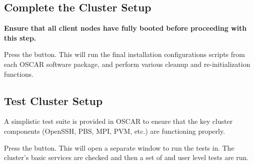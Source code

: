 
\subsection{Complete the Cluster Setup}
\label{det:complete-cluster-setup}

{\bf Ensure that all client nodes have fully booted before proceeding
  with this step.}

Press the  button.  This will run the
final installation configurations scripts from each OSCAR software
package, and perform various cleanup and re-initialization functions.



\subsection{Test Cluster Setup}
\label{det:test-cluster}
            
A simplistic test suite is provided in OSCAR to ensure that the key
cluster components (OpenSSH, PBS, MPI, PVM, etc.) are functioning
properly.

Press the  button. This will open a
separate window to run the tests in.  The cluster's basic services are
checked and then a set of  and user level tests are run.

